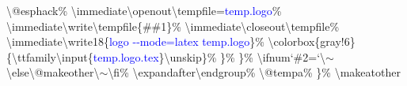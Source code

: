 \begin{linenumbers}
\hspace*{3.6em}\textbackslash @esphack\%\newline
\hspace*{3.6em}\textbackslash immediate\textbackslash openout\textbackslash tempf{}ile=\textcolor{blue}{temp.logo}\%\newline
\hspace*{3.6em}\textbackslash immediate\textbackslash write\textbackslash tempf{}ile\{\#\#1\}\%\newline
\hspace*{3.6em}\textbackslash immediate\textbackslash closeout\textbackslash tempf{}ile\%\newline
\hspace*{3.6em}\textbackslash immediate\textbackslash write18\{\textcolor{blue}{logo -{}-mode=latex temp.logo}\}\%\newline
\hspace*{3.6em}\textbackslash colorbox\{gray!6\}\{\textbackslash ttfamily\textbackslash input\{\textcolor{blue}{temp.logo.tex}\}\textbackslash unskip\}\%\newline
\hspace*{2.4em}\}\%\newline
\hspace*{1.2em}\}\%\newline
\hspace*{1.2em}\textbackslash ifnum`\#2=`\textbackslash $\sim$\textbackslash else\textbackslash @makeother\textbackslash $\sim$\textbackslash f{}i\%\newline
\hspace*{1.2em}\textbackslash expandafter\textbackslash endgroup\%\newline
\hspace*{1.2em}\textbackslash @tempa\%\newline
\}\%\newline
\textbackslash makeatother
\end{linenumbers}

